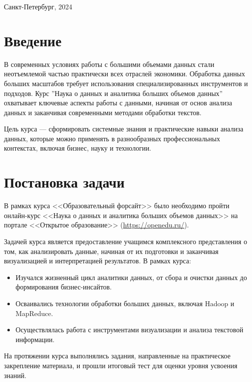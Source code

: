 \documentclass[a4paper, final]{article}
\begin{document}
\hfill \break
\hfill \break
\begin{center} \small{Санкт-Петербург, 2024} \end{center}
\thispagestyle{empty} %

\newpage

\tableofcontents

\newpage

\cleardoublepage
{}
{}
\section*{Введение}
В современных условиях работы с большими объемами данных стали неотъемлемой частью практически всех отраслей экономики. Обработка данных больших масштабов требует использования специализированных инструментов и подходов. Курс ''Наука о данных и аналитика больших объемов данных'' охватывает ключевые аспекты работы с данными, начиная от основ анализа данных и заканчивая современными методами обработки текстов.

Цель курса — сформировать системные знания и практические навыки анализа данных, которые можно применять в разнообразных профессиональных контекстах, включая бизнес, науку и технологии.

\newpage
\section{Постановка задачи}
В рамках курса <<Образовательный форсайт>> было необходимо пройти онлайн-курс <<Наука о данных и аналитика больших объемов данных>> на портале <<Открытое образование>> (\url{https://openedu.ru/}).

Задачей курса является предоставление учащимся комплексного представления о том, как анализировать данные, начиная от их подготовки и заканчивая визуализацией и интерпретацией результатов. В рамках курса:
\begin{itemize}
  \item Изучался жизненный цикл аналитики данных, от сбора и очистки данных до формирования бизнес-инсайтов.
  \item Осваивались технологии обработки больших данных, включая Hadoop и MapReduce.
  \item Осуществлялась работа с инструментами визуализации и анализа текстовой информации.
\end{itemize}

На протяжении курса выполнялись задания, направленные на практическое закрепление материала, и прошли итоговый тест для оценки уровня усвоения знаний.
\end{document}
